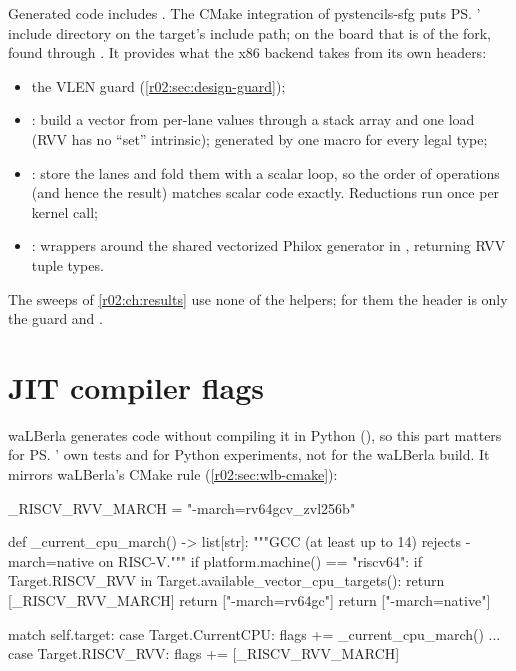 Generated code includes . The CMake integration of
pystencils-sfg puts \ps{}' include directory on the target's include path; on the board
that is  of the fork, found through
. It provides what the x86
backend takes from its own headers:
\begin{itemize}
  \item the VLEN guard (\cref{r02:sec:design-guard});
  \item {}: build a vector from per-lane values through a
        stack array and one load (RVV has no ``set'' intrinsic); generated by one macro
        for every legal type;
  \item {}: store the lanes and fold them
        with a scalar loop, so the order of operations (and hence the result) matches
        scalar code exactly. Reductions run once per kernel call;
  \item {}: wrappers around the shared vectorized Philox
        generator in , returning RVV tuple types.
\end{itemize}
The sweeps of \cref{r02:ch:results} use none of the helpers; for them the header is
only the guard and .

\section{JIT compiler flags}\label{r02:sec:ps-jit}

waLBerla generates code without compiling it in Python (), so
this part matters for \ps{}' own tests and for Python experiments, not for the
waLBerla build. It mirrors waLBerla's CMake rule (\cref{r02:sec:wlb-cmake}):
\begin{pycode}[nolol=false,caption={[JIT compiler flags for RISC-V]Compiler flags in \texttt{jit/cpu/compiler\_info.py} (abridged).},label=r02:lst:jitflags]
_RISCV_RVV_MARCH = "-march=rv64gcv_zvl256b"

def _current_cpu_march() -> list[str]:
    """GCC (at least up to 14) rejects -march=native on RISC-V."""
    if platform.machine() == "riscv64":
        if Target.RISCV_RVV in Target.available_vector_cpu_targets():
            return [_RISCV_RVV_MARCH]
        return ["-march=rv64gc"]
    return ["-march=native"]

        match self.target:
            case Target.CurrentCPU:
                flags += _current_cpu_march()
            ...
            case Target.RISCV_RVV:
                flags += [_RISCV_RVV_MARCH]
\end{pycode}

